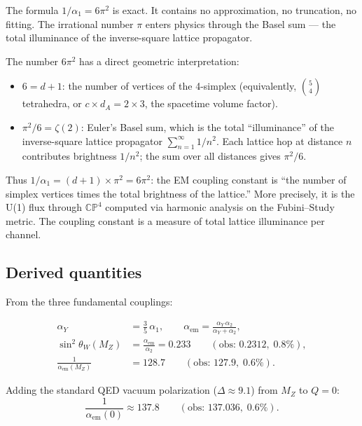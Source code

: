 \begin{remark}
The formula $1/\alpha_1 = 6\pi^2$ is exact. It contains no approximation, no truncation, no fitting. The irrational number $\pi$ enters physics through the Basel sum --- the total illuminance of the inverse-square lattice propagator.
\end{remark}

\begin{remark}
The number $6\pi^2$ has a direct geometric interpretation:
\begin{itemize}
\item $6 = d + 1$: the number of vertices of the 4-simplex (equivalently, $\binom{5}{4}$ tetrahedra, or $c \times d_A = 2 \times 3$, the spacetime volume factor).
\item $\pi^2/6 = \zeta(2)$: Euler's Basel sum, which is the total ``illuminance'' of the inverse-square lattice propagator $\sum_{n=1}^\infty 1/n^2$. Each lattice hop at distance $n$ contributes brightness $1/n^2$; the sum over all distances gives $\pi^2/6$.
\end{itemize}
Thus $1/\alpha_1 = (d+1) \times \pi^2 = 6\pi^2$: the EM coupling constant is ``the number of simplex vertices times the total brightness of the lattice.'' More precisely, it is the U(1) flux through $\mathbb{CP}^4$ computed via harmonic analysis on the Fubini--Study metric. The coupling constant is a measure of total lattice illuminance per channel.
\end{remark}

\subsection{Derived quantities}

From the three fundamental couplings:

\begin{align}
\alpha_Y &= \tfrac{3}{5}\,\alpha_1, \qquad \alpha_\text{em} = \frac{\alpha_Y\,\alpha_2}{\alpha_Y + \alpha_2}, \\
\sin^2\theta_W(M_Z) &= \frac{\alpha_\text{em}}{\alpha_2} = 0.233 \qquad (\text{obs: } 0.2312,\; 0.8\%), \\
\frac{1}{\alpha_\text{em}(M_Z)} &= 128.7 \qquad (\text{obs: } 127.9,\; 0.6\%).
\end{align}

Adding the standard QED vacuum polarization ($\Delta \approx 9.1$) from $M_Z$ to $Q = 0$:
\begin{equation}
\frac{1}{\alpha_\text{em}(0)} \approx 137.8 \qquad (\text{obs: } 137.036,\; 0.6\%).
\end{equation}

